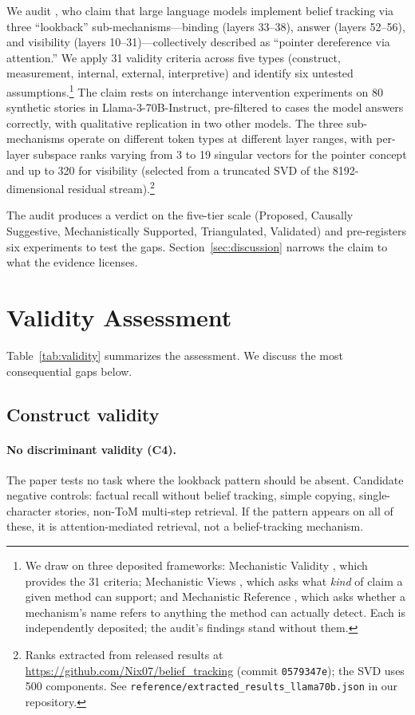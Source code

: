 \documentclass[11pt]{article}
\begin{document}
We audit \citet{prakash2025lookback}, who claim that large language models implement belief tracking via three ``lookback'' sub-mechanisms---binding (layers 33--38), answer (layers 52--56), and visibility (layers 10--31)---collectively described as ``pointer dereference via attention.'' We apply 31 validity criteria across five types (construct, measurement, internal, external, interpretive) and identify six untested assumptions.\footnote{We draw on three deposited frameworks: Mechanistic Validity \citep{tower2026mechval}, which provides the 31 criteria; Mechanistic Views \citep{tower2026mechviews}, which asks what \emph{kind} of claim a given method can support; and Mechanistic Reference \citep{tower2026mechref}, which asks whether a mechanism's name refers to anything the method can actually detect. Each is independently deposited; the audit's findings stand without them.} The claim rests on interchange intervention experiments on 80 synthetic stories in Llama-3-70B-Instruct, pre-filtered to cases the model answers correctly, with qualitative replication in two other models. The three sub-mechanisms operate on different token types at different layer ranges, with per-layer subspace ranks varying from 3 to 19 singular vectors for the pointer concept and up to 320 for visibility (selected from a truncated SVD of the 8192-dimensional residual stream).\footnote{Ranks extracted from released results at \url{https://github.com/Nix07/belief_tracking} (commit \texttt{0579347e}); the SVD uses 500 components. See \texttt{reference/extracted\_results\_llama70b.json} in our repository.}

The audit produces a verdict on the five-tier scale (Proposed, Causally Suggestive, Mechanistically Supported, Triangulated, Validated) and pre-registers six experiments to test the gaps. Section~\ref{sec:discussion} narrows the claim to what the evidence licenses.


\section{Validity Assessment}
\label{sec:validity}

Table~\ref{tab:validity} summarizes the assessment. We discuss the most consequential gaps below.

\subsection{Construct validity}

\paragraph{No discriminant validity (C4).}
The paper tests no task where the lookback pattern should be absent. Candidate negative controls: factual recall without belief tracking, simple copying, single-character stories, non-ToM multi-step retrieval. If the pattern appears on all of these, it is attention-mediated retrieval, not a belief-tracking mechanism.
\end{document}
